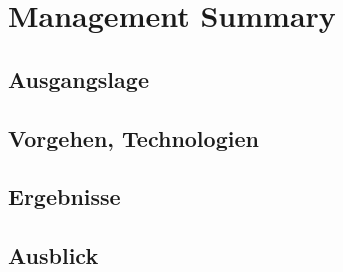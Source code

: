 \cleardoublepage

\section*{Management Summary}
\subsection*{Ausgangslage}

\subsection*{Vorgehen, Technologien}

\subsection*{Ergebnisse}

\subsection*{Ausblick}
